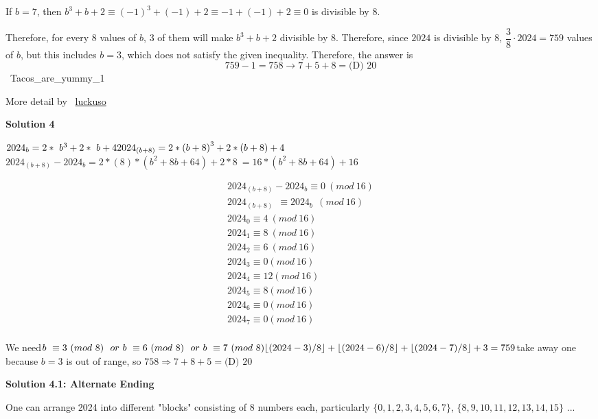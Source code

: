 \begin{enumerate}
 If $b=7$, then $b^3+b+2 \equiv (-1)^3 + (-1) + 2 \equiv -1 + (-1) + 2 \equiv 0$ is divisible by $8$.

 Therefore, for every $8$ values of $b$, $3$ of them will make $b^3+b+2$ divisible by $8$. Therefore, since $2024$ is divisible by $8$, $\dfrac{3}{8}\cdot2024=759$ values of $b$, but this includes $b=3$, which does not satisfy the given inequality. Therefore, the answer is 
 \[759-1=758\rightarrow7+5+8=\boxed{\text{(D) }20}\] ~Tacos\_are\_yummy\_1

 More detail by ~\href{https://artofproblemsolving.com/wiki/index.php/User:Cyantist}{luckuso}

 



\textbf{Solution 4}

$2024_b=2\ast\ b^3+2\ast\ b+4\ \\ {2024}_{\left(b+8\right)}=2\ast\left(b+8\right)^3+2\ast\left(b+8\right)+4$${2024}_{\left(b+8\right)}-{2024}_b=2*\left(8\right)*\left(b^2+8b+64\right)+2*8\ =16*\left(b^2+8b+64\right)+16$

 \begin{align*}2024_{(b+8)}-2024_b\equiv0\ (mod\ 16)\\2024_{(b+8)}\ \ \equiv2024_b\ \ (mod\ 16)\\2024_0\equiv4\ (mod\ 16)\\2024_1\equiv8\ (mod\ 16)\\2024_2\equiv6\ (mod\ 16)\\2024_3\equiv0(mod\ 16)\\2024_4\equiv12(mod\ 16)\\2024_5\equiv8(mod\ 16)\\2024_6\equiv0(mod\ 16)\\2024_7\equiv0(mod\ 16)\\\end{align*}


 We need$b\ \equiv3\ (mod\ 8)\ \ or\ b\ \equiv6\ (mod\ 8)\ \ or\ b\ \equiv7\ (mod\ 8) \\ \lfloor(2024-3)/8\rfloor+\lfloor(2024-6)/8\rfloor+\lfloor(2024-7)/8\rfloor+3=759$take away one because $b=3$ is out of range, so $758\Rightarrow7+8+5=\boxed{\text{(D) }20}$




\textbf{Solution 4.1: Alternate Ending}

One can arrange 2024 into different "blocks" consisting of 8 numbers each, particularly \( \{0,1,2,3,4,5,6,7\} \), \( \{8,9,10,11,12,13,14,15\} \) ...


\end{enumerate}
